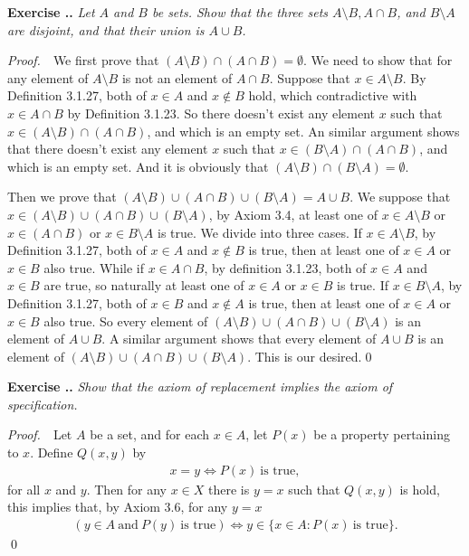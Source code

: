 \documentclass{book}
\newcommand{\pff}{\vspace{.25em}\noindent\emph{Proof.}~~}
\newcounter{Exercise}[section]
\renewcommand{\theExercise}{\thesection.\arabic{Exercise}.}
\newcommand{\new}{\vspace{1.5em}\noindent\textbf{{Exercise \stepcounter{Exercise}\textbf{\theExercise}}} }
\begin{document}
\new\emph{Let $A$ and $B$ be sets. Show that the three sets $A\setminus B, A\cap B$, and $B\setminus A$ are disjoint, and that their union is $A\cup B$.}

\pff We first prove that $(A\setminus B)\cap(A\cap B)=\emptyset$. We need to show that for any element of $A\setminus B$ is not an element of $A\cap B$. Suppose that $x\in A\setminus B$. By Definition 3.1.27, both of $x\in A$ and $x\notin B$ hold, which contradictive with $x\in A\cap B$ by Definition 3.1.23. So there doesn't exist any element $x$ such that $x\in(A\setminus B)\cap(A\cap B)$, and which is an empty set. An similar argument shows that there doesn't exist any element $x$ such that $x\in(B\setminus A)\cap(A\cap B)$, and which is an empty set. And it is obviously that $(A\setminus B)\cap(B\setminus A)=\emptyset$. 

Then we prove that $(A\setminus B)\cup(A\cap B)\cup(B\setminus A)=A\cup B$. We suppose that $x\in(A\setminus B)\cup(A\cap B)\cup(B\setminus A)$, by Axiom 3.4, at least one of $x\in A\setminus B$ or $x\in(A\cap B)$ or $x\in B\setminus A$ is true. We divide into three cases. If $x\in A\setminus B$, by Definition 3.1.27, both of $x\in A$ and $x\notin B$ is true, then at least one of $x\in A$ or $x\in B$ also true. While if $x\in A\cap B$, by definition 3.1.23, both of $x\in A$ and $x\in B$ are true, so naturally at least one of $x\in A$ or $x\in B$ is true. If $x\in B\setminus A$, by Definition 3.1.27, both of $x\in B$ and $x\notin A$ is true, then at least one of $x\in A$ or $x\in B$ also true. So every element of $(A\setminus B)\cup(A\cap B)\cup(B\setminus A)$ is an element of $A\cup B$. A similar argument shows that every element of $A\cup B$ is an element of $(A\setminus B)\cup(A\cap B)\cup(B\setminus A)$. This is our desired.\qed

\new\emph{Show that the axiom of replacement implies the axiom of specification.}

\pff Let $A$ be a set, and for each $x\in A$, let $P(x)$ be a property pertaining to $x$. Define $Q(x,y)$ by
    \begin{align*}
        x=y\iff P(x)\ \textrm{is true},
    \end{align*}
for all $x$ and $y$. Then for any $x\in X$ there is $y=x$ such that $Q(x,y)$ is hold, this implies that, by Axiom 3.6, for any $y=x$
    \begin{align*}
        (y\in A\ \textrm{and}\ P(y)\ \textrm{is true})\iff y\in\{x\in A:P(x)\ \textrm{is true}\}.
    \end{align*}\qed
\newpage
\end{document}
